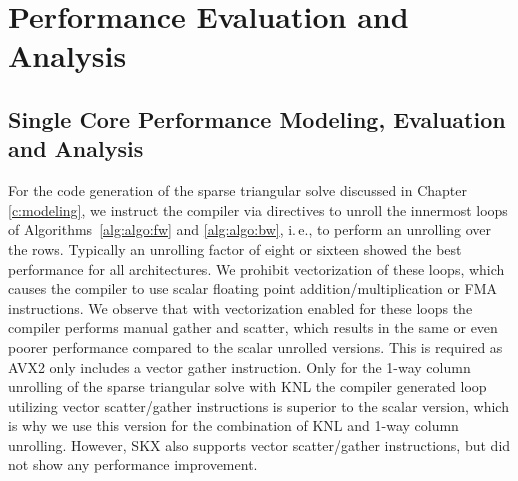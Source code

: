 \chapter{Performance Evaluation and Analysis}
\label{sec:pa}
\label{sec:performance}

\section{Single Core Performance Modeling, Evaluation and Analysis}
\label{sec:performance:singlecore}

For the code generation
of the sparse triangular solve discussed in Chapter \ref{c:modeling}, we instruct
the compiler via directives to unroll the
innermost loops of Algorithms~\ref{alg:algo:fw} and \ref{alg:algo:bw}, i.\,e.,
to perform an unrolling over the rows.
Typically an unrolling factor of eight or sixteen showed the best
performance for all architectures.
%
We prohibit vectorization of these loops, which causes the
compiler to use scalar floating point addition/multiplication or FMA
instructions.
%
We observe that
with vectorization enabled for these loops the compiler
performs manual gather and scatter, which results in the same or even poorer
performance compared to the scalar unrolled versions.
This is required as AVX2 only includes a vector gather instruction.
%
Only for the 1-way column unrolling of the sparse triangular solve
with KNL the compiler
generated loop utilizing vector scatter/gather instructions is superior to
the scalar version, which is why we use this version for the combination of KNL
and 1-way column unrolling.
However, SKX also supports vector scatter/gather instructions, but did not
show any performance improvement.

